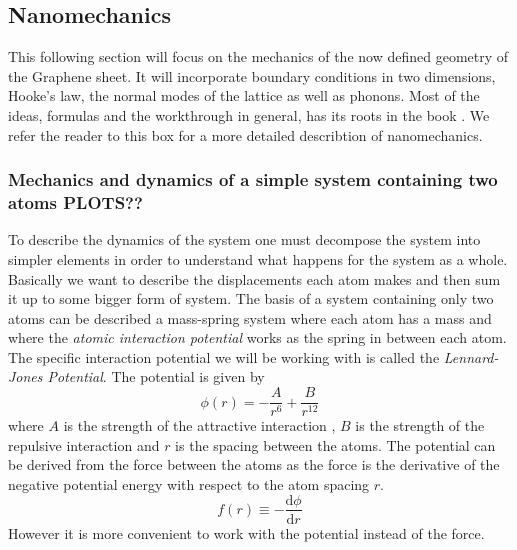 
\subsection{Nanomechanics}
This following section will focus on the mechanics of the now defined geometry of the Graphene sheet. It will incorporate boundary conditions in two dimensions, Hooke's law, the normal modes of the lattice as well as phonons. Most of the ideas, formulas and the workthrough in general, has its roots in the book . We refer the reader to this box for a more detailed describtion of nanomechanics.  
\subsubsection{Mechanics and dynamics of a simple system containing two atoms PLOTS??}
To describe the dynamics of the system one must decompose the system into simpler elements in order to understand what happens for the system as a whole. Basically we want to describe the displacements each atom makes and then sum it up to some bigger form of system. The basis of a system containing only two atoms can be described a mass-spring system where each atom has a mass and where the \textit{atomic interaction potential} works as the spring in between each atom. The specific interaction potential we will be working with is called the \textit{Lennard-Jones Potential}. The potential is given by \begin{equation}
    \phi(r)=-\dfrac{A}{r^{6}}+\dfrac{B}{r^{12}}\label{LJPot}
\end{equation} where $A$ is the strength of the attractive interaction , $B$ is the strength of the repulsive interaction and $r$ is the spacing between the atoms.
The potential can be derived from the force between the atoms as the force is the derivative of the negative potential energy with respect to the atom spacing $r$.\begin{equation}
    f(r)\equiv -\dfrac{\text{d}\phi}{\text{d}r}
\end{equation} However it is more convenient to work with the potential instead of the force. \\
